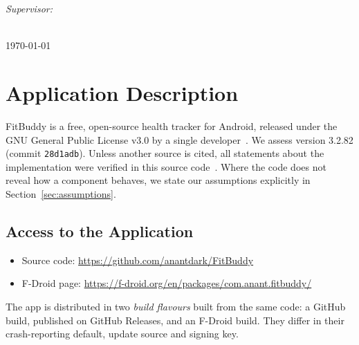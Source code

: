 \documentclass[a4paper,12pt]{article}
\begin{document}
\begin{titlepage}
\begin{minipage}{0.48\textwidth}
\begin{flushright}
    \emph{Supervisor:} \\

    \end{flushright}
    \end{minipage}\\[1.5cm]



\vspace{0.5cm}
{\large \today}\\[1.5cm] %
\vfill %
\end{titlepage}
\pagebreak

    \newpage
    \thispagestyle{empty}
    \tableofcontents
    \newpage




\section{Application Description}
\label{sec:application}

FitBuddy is a free, open-source health tracker for Android, released under the GNU General
Public License v3.0 by a single developer~\cite{fitbuddy-repo}. We assess version 3.2.82 (commit
\texttt{28d1adb}). Unless another source is cited, all statements about the implementation were
verified in this source code~\cite{fitbuddy-repo}. Where the code does not reveal how a
component behaves, we state our assumptions explicitly in Section~\ref{sec:assumptions}.

\subsection{Access to the Application}
\begin{itemize}
  \item Source code: \url{https://github.com/anantdark/FitBuddy}~\cite{fitbuddy-repo}
  \item F-Droid page: \url{https://f-droid.org/en/packages/com.anant.fitbuddy/}~\cite{fitbuddy-fdroid}
\end{itemize}
The app is distributed in two \emph{build flavours} built from the same code: a GitHub build,
published on GitHub Releases, and an F-Droid build. They differ in their crash-reporting
default, update source and signing key.
\end{document}

